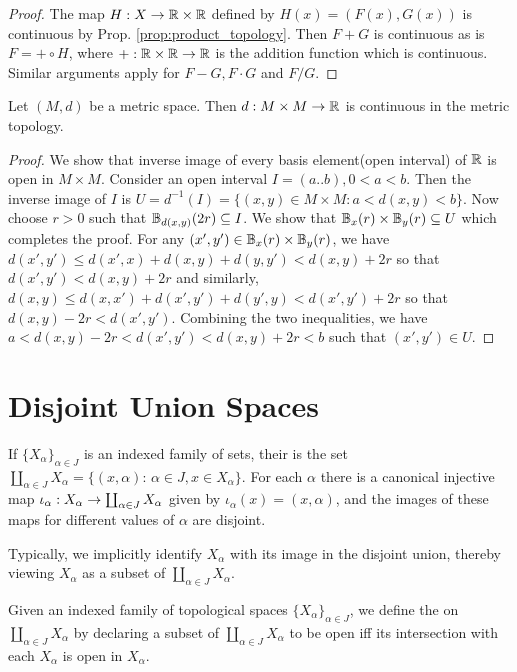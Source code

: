 \documentclass[11pt,a4paper]{article}
\begin{document}
\begin{proof}
The map $H:X\rightarrow \mathbb{R}\times\mathbb{R}$ defined by $H(x) = (F(x),G(x))$ is continuous by Prop. \ref{prop:product_topology}. Then $F+G$ is continuous as  is $F = +\circ H$, where $+:\mathbb{R}\times \mathbb{R}\rightarrow \mathbb{R}$ is the addition function which is continuous. Similar arguments apply for $F-G,F\cdot G$ and $F/G$.
\end{proof}

\begin{proposition}
Let $(M,d)$ be a metric space. Then $d:M\times M\rightarrow \mathbb{R}$ is continuous in the metric topology.
\end{proposition}

\begin{proof}
We show that inverse image of every basis element(open interval) of $\mathbb{R}$ is open in $M\times M$. Consider an open interval $I = (a..b), 0<a<b$. Then the inverse image of $I$ is $U = d^{-1}(I) = \{(x,y)\in M\times M:a<d(x,y)<b\}$. Now choose $r>0$ such that $\mathbb{B}_{d(x,y)}(2r)\subseteq I$. We show that $\mathbb{B}_x(r)\times \mathbb{B}_y(r) \subseteq U$ which completes the proof. For any $(x',y')\in \mathbb{B}_x(r)\times \mathbb{B}_y(r)$, we have $d(x',y')\le d(x',x)+d(x,y)+d(y,y')<d(x,y)+2r$ so that $d(x',y')<d(x,y)+2r$ and similarly, $d(x,y)\le d(x,x')+d(x',y')+d(y',y)<d(x',y')+2r$ so that $d(x,y) - 2r < d(x',y')$. Combining the two inequalities, we have $a< d(x,y)-2r<d(x',y')<d(x,y)+2r<b$ such that $(x',y')\in U$. 
\end{proof}

\section{Disjoint Union Spaces}

\begin{definition}
If $\{X_\alpha\}_{\alpha\in J}$ is an indexed family of sets, their  is the set $\coprod_{\alpha\in J}X_\alpha = \{(x,\alpha):\,\alpha \in J, x\in X_\alpha\}$. For each $\alpha$ there is a canonical injective map $\iota_\alpha:X_\alpha\rightarrow \coprod_{\alpha\in J}X_\alpha$ given by $\iota_\alpha(x) = (x,\alpha)$, and the images of these maps for different values of $\alpha$ are disjoint. 
\end{definition}

Typically, we implicitly identify $X_\alpha$ with its image in the disjoint union, thereby viewing $X_\alpha$ as a subset of $\coprod_{\alpha\in J}X_\alpha$. 

\begin{definition}\label{def:disjoint_union_topology}
Given an indexed family of topological spaces $\{X_\alpha\}_{\alpha\in J}$, we define the   on $\coprod_{\alpha\in J}X_\alpha$ by declaring a subset of $\coprod_{\alpha\in J}X_\alpha$ to be open iff its intersection with each $X_\alpha$ is open in $X_\alpha$.
\end{definition}
\end{document}
